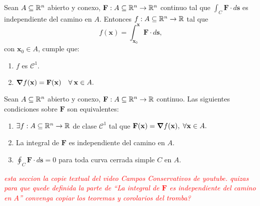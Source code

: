 \begin{theorem}
    Sean $A\subseteq\mathbb{R}^n$ abierto y conexo, $\mathbf{F}:A\subseteq\mathbb{R}^n\to\mathbb{R}^n$ continuo tal que $\int_C \mathbf{F}\cdot d\mathbf{s}$ es independiente del camino en $A$. Entonces $f:A\subseteq\mathbb{R}^n\to\mathbb{R}$ tal que
    $$f(\mathbf{x})=\int_{\mathbf{x}_0}^{\mathbf{x}}\mathbf{F}\cdot d\mathbf{s},$$
    con $\mathbf{x}_0\in A$, cumple que: 
    \begin{enumerate}
        \item $f$ es $\mathcal{C}^1$.
        \item $\grad f(\mathbf{x})=\mathbf{F}(\mathbf{x})\quad\forall\:\mathbf{x}\in A.$
    \end{enumerate}
\end{theorem}

\begin{theorem}
    Sean $A\subseteq\mathbb{R}^n$ abierto y conexo, $\mathbf{F}:A\subseteq\mathbb{R}^n\to\mathbb{R}$ continuo. Las siguientes condiciones sobre $\mathbf{F}$ son equivalentes:
    \begin{enumerate}
        \item $\exists f:A\subseteq\mathbb{R}^n\to\mathbb{R}$ de clase $\mathcal{C}^1$ tal que $\mathbf{F}(\mathbf{x})=\grad f(\mathbf{x}),\;\forall\mathbf{x}\in A.$ 
        \item La integral de $\mathbf{F}$ es independiente del camino en $A$.
        \item $\oint_C\mathbf{F}\cdot d\mathbf{s}=0$ para toda curva cerrada simple $C$ en $A$.
    \end{enumerate}
\end{theorem}

\textcolor{red}{\textit{esta seccion la copie textual del video Campos Conservativos de youtube. quizas para que quede definida la parte de ``La integral de $\mathbf{F}$ es independiente del camino en $A$'' convenga copiar los teoremas y corolarios del tromba?}}